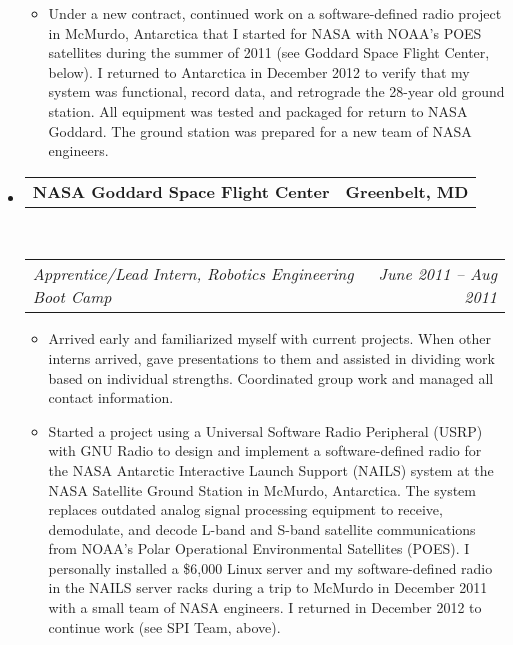 \documentclass[10pt,letterpaper]{article}
\makeatletter
\newcommand{\headerrow}[2]
{\begin{tabular*}{\linewidth}{l@{\extracolsep{\fill}}r}
	#1 & #2 \\
\end{tabular*}}
\makeatother
\begin{document}
\begin{itemize}
\begin{itemize}

        \item Under a new contract, continued work on a software-defined radio
            project in McMurdo, Antarctica that I started for NASA with NOAA's
            POES satellites during the summer of 2011 (see Goddard Space Flight
            Center, below).  I returned to Antarctica in December 2012 to
            verify that my system was functional, record data, and retrograde
            the 28-year old ground station.  All equipment was tested and
            packaged for return to NASA Goddard.  The ground station was
            prepared for a new team of NASA engineers.
	\end{itemize}

	\item
	\headerrow
		{\textbf{NASA Goddard Space Flight Center}}
		{\textbf{Greenbelt, MD}}
	\\
	\headerrow
		{\emph{Apprentice/Lead Intern, Robotics Engineering Boot Camp}}
		{\emph{June 2011 -- Aug 2011}}
	\begin{itemize}
        \item Arrived early and familiarized myself with current projects.
            When other interns arrived, gave presentations to them and assisted
            in dividing work based on individual strengths.  Coordinated group
            work and managed all contact information.

        \item Started a project using a Universal Software Radio Peripheral
            (USRP) with GNU Radio to design and implement a software-defined
            radio for the NASA Antarctic Interactive Launch Support (NAILS)
            system at the NASA Satellite Ground Station in McMurdo, Antarctica.
            The system replaces outdated analog signal processing equipment to
            receive, demodulate, and decode L-band and S-band satellite
            communications from NOAA's Polar Operational Environmental
            Satellites (POES).  I personally installed a \$6,000 Linux server
            and my software-defined radio in the NAILS server racks during a
            trip to McMurdo in December 2011 with a small team of NASA
            engineers.  I returned in December 2012 to continue work (see SPI
            Team, above).


\end{itemize}
\end{itemize}
\end{document}
